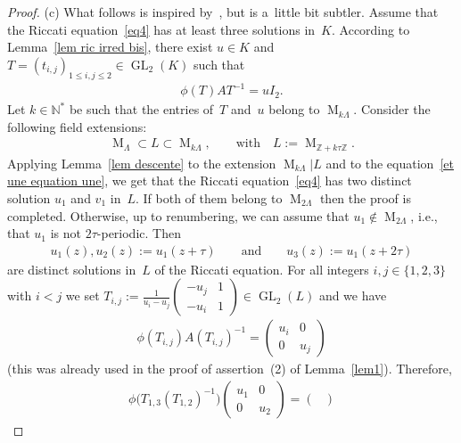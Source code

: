 \documentclass[11pt]{article}
\numberwithin{equation}{section}
\begin{document}
\begin{proof}
(c) What follows is inspired by~\cite[Theorem~4.2]{Hen98}, but is a~little bit subtler.
Assume that the Riccati equation~\eqref{eq4} has at least three solutions in~$K$.
According to Lemma~\ref{lem ric irred bis}, there exist $u\in K$ and ${T=(t_{i,j})_{1 \leq i,j \leq 2} \in
\operatorname{GL}_{2}(K)}$ such that
\begin{gather}
\label{et une equation une}
\phi(T)AT^{-1}=u I_{2}.
\end{gather}
Let $k \in \mathbb N^{*}$ be such that the entries of~$T$ and~$u$ belong to $\operatorname{M}_{k \Lambda}$.
Consider the following f\/ield extensions:
\begin{gather*}
\operatorname{M}_{\Lambda} \subset L \subset \operatorname{M}_{k\Lambda}, \qquad \text{with}\quad L:=\operatorname{M}_{\mathbb
Z+k\tau\mathbb Z}.
\end{gather*}
Applying Lemma~\ref{lem descente} to the extension $\operatorname{M}_{k\Lambda}\vert L$ and to the equation~\eqref{et
une equation une}, we get that the Riccati equation~\eqref{eq4} has two distinct solution $u_{1}$ and $v_{1}$ in~$L$.
If both of them belong to $\operatorname{M}_{2\Lambda}$ then the proof is completed.
Otherwise, up to renumbering, we can assume that $u_{1} \not \in \operatorname{M}_{2\Lambda}$, i.e., that $u_{1}$ is
not $2\tau$-periodic.
Then
\begin{gather*}
u_{1}(z),u_{2}(z):=u_{1}(z+\tau) \qquad \text{and} \qquad u_{3}(z):=u_{1}(z+2\tau)
\end{gather*}
are distinct solutions in~$L$ of the Riccati equation.
For all integers $i,j \in \{1,2,3\}$ with $i<j$ we set $T_{i,j}:=\frac{1}{u_{i}-u_{j}}
\begin{pmatrix}
-u_{j}&1
\\
-u_{i}&1
\end{pmatrix}
\in \operatorname{GL}_{2}(L)$ and we have
\begin{gather*}
\phi (T_{i,j} )A (T_{i,j} )^{-1}=
\begin{pmatrix}
u_{i}&0
\\
0&u_{j}
\end{pmatrix}
\end{gather*}
(this was already used in the proof of assertion~(2) of Lemma~\ref{lem1}).
Therefore,
\begin{gather*}
\phi\big(T_{1,3} (T_{1,2} )^{-1}\big)
\begin{pmatrix}
u_{1}&0
\\
0&u_{2}
\end{pmatrix}
=
\begin{pmatrix}

\end{pmatrix}
\end{gather*}
\end{proof}
\end{document}
